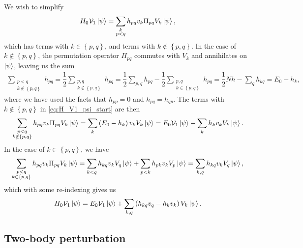\documentclass[nofootinbib,notitlepage,11pt]{revtex4-2}
\newcommand{\f}[2]{\dfrac{#1}{#2}} %
\newcommand{\p}[1]{\left(#1\right)} %
\renewcommand{\set}[1]{\left\{#1\right\}} %
\newcommand{\1}{\mathds{1}}
\newcommand{\V}{\mathcal{V}}
\begin{document}
We wish to simplify
\begin{align}
  H_0 \V_1 \ket\psi
  = \sum_{\substack{k\\p<q}} h_{pq} v_k \Pi_{pq} V_k \ket\psi,
  \label{eq:H_V1_psi_start}
\end{align}
which has terms with $k\in\set{p,q}$, and terms with
$k\notin\set{p,q}$.  In the case of $k\notin\set{p,q}$, the
permutation operator $\Pi_{pq}$ commutes with $V_k$ and annihilates on
$\ket\psi$, leaving us the sum
\begin{align}
  \sum_{\substack{p<q\\k\notin\set{p,q}}} h_{pq}
  = \f12 \sum_{\substack{p,q\\k\notin\set{p,q}}} h_{pq}
  = \f12 \sum_{p,q} h_{pq}
  - \f12 \sum_{\substack{p,q\\k\in\set{p,q}}} h_{pq}
  = \f12 N h - \sum_q h_{kq}
  = E_0 - h_k,
\end{align}
where we have used the facts that $h_{pp}=0$ and $h_{pq}=h_{qp}$.  The
terms with $k\notin\set{p,q}$ in \eqref{eq:H_V1_psi_start} are then
\begin{align}
  \sum_{\substack{p<q\\k\notin\set{p,q}}}
  h_{pq} v_k \Pi_{pq} V_k \ket\psi
  = \sum_k \p{E_0 - h_k} v_k V_k \ket\psi
  = E_0 \V_1 \ket\psi - \sum_k h_k v_k V_k \ket\psi.
\end{align}
In the case of $k\in\set{p,q}$, we have
\begin{align}
  \sum_{\substack{p<q\\k\in\set{p,q}}}
  h_{pq} v_k \Pi_{pq} V_k \ket\psi
  = \sum_{k<q} h_{kq} v_k V_q \ket\psi
  + \sum_{p<k} h_{pk} v_k V_p \ket\psi
  = \sum_{k,q} h_{kq} v_k V_q \ket\psi,
\end{align}
which with some re-indexing gives us
\begin{align}
  H_0 \V_1 \ket\psi
  = E_0 \V_1 \ket\psi
  + \sum_{k,q} \p{h_{kq} v_q - h_k v_k} V_k \ket\psi.
\end{align}

\subsection{Two-body perturbation}
\label{sec:H_V2_psi}
\end{document}
